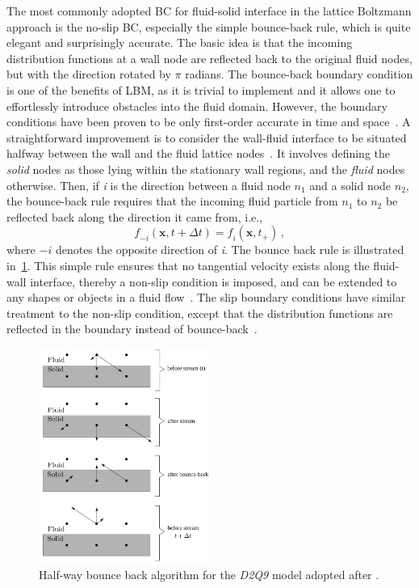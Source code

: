 The most commonly adopted BC for fluid-solid interface in the lattice Boltzmann 
approach is the no-slip BC, especially the simple bounce-back rule, which is 
quite elegant and surprisingly accurate. The basic idea is that the incoming 
distribution functions at a wall node are reflected back to the original fluid 
nodes, but with the direction rotated by $\pi$ radians. The bounce-back 
boundary condition is one of the benefits of LBM, as it is trivial to implement 
and it allows one to effortlessly introduce obstacles into the fluid domain. 
However, the boundary conditions have been proven to be only first-order 
accurate in time and space~\citep{Pan2006}. A straightforward improvement is to 
consider the wall-fluid interface to be situated halfway between the wall and 
the fluid lattice nodes~\citep{Ziegler1993}. It involves defining the 
\textit{solid} nodes as those lying within the stationary wall regions, and the 
\textit{fluid} nodes otherwise. Then, if \textit{i} is the direction between a 
fluid node $\mathit{n}_{1}$ and a solid node $\mathit{n_2}$, the bounce-back 
rule requires that the incoming fluid particle from $\mathit{n}_{1}$ to 
$\mathit{n}_{2}$ be reflected back along the direction it came from, i.e.,
%
\begin{equation}
	\mathit{f}_{-\mathit{i}}(\mathbf{x}, \mathit{t}+\Delta \mathit{t}) = 
	\mathit{f_i}(\mathbf{x}, \mathit{t}_{+})\,,
\end{equation}
%
\noindent where $-\mathit{i}$ denotes the opposite direction of 
\textit{i}. The bounce back rule is illustrated 
in~\cref{fig:bounce}. This simple rule ensures that no 
tangential velocity exists along the fluid-wall interface, 
thereby a non-slip condition is imposed, and can be extended to 
any shapes or objects in a fluid flow~\citep{Han2007b,Zou1997}. 
The slip boundary conditions have similar treatment to the 
non-slip condition, except that the distribution functions are 
reflected in the boundary instead of 
bounce-back~\citep{Succi2001}.

\begin{figure}[htbp]
	\centering
	\includegraphics[width=0.5\textwidth]{bounce}
	\caption[Half-way bounce back algorithm for the \textit{D2Q9} model 
	]{Half-way 
	bounce back algorithm for the \textit{D2Q9} model adopted after 
	\citet{Sukop2006}.}
	\label{fig:bounce}
\end{figure}

